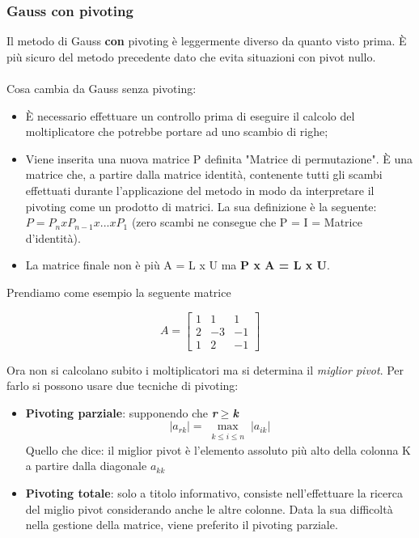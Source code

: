 \subsubsection{Gauss con pivoting}
\label{Gauss con pivoting}
Il metodo di Gauss \textbf{con} pivoting è leggermente diverso da quanto visto prima. È più sicuro del metodo precedente dato che evita situazioni con pivot nullo.\\\\
Cosa cambia da Gauss senza pivoting:
\begin{itemize}
\item È necessario effettuare un controllo prima di eseguire il calcolo del moltiplicatore che potrebbe portare ad uno scambio di righe;
\item Viene inserita una nuova matrice P definita "Matrice di permutazione". È una matrice che, a partire dalla matrice identità, contenente tutti gli scambi effettuati durante l'applicazione del metodo in modo da interpretare il pivoting come un prodotto di matrici. La sua definizione è la seguente: $P = P_n x P_{n-1} x ... x P_1$  (zero scambi ne consegue che P = I = Matrice d'identità).
\item La matrice finale non è più A = L x U ma \textbf{P x A = L x U}.
\end{itemize}

\noindent

Prendiamo come esempio la seguente matrice

$$ A =
\begin{bmatrix}
1 & 1 & 1 \\
2 & -3 & -1 \\
1 & 2 & -1 
\end{bmatrix}
$$

\noindent
Ora non si calcolano subito i moltiplicatori ma si determina il \textit{miglior pivot}. Per farlo si possono usare due tecniche di pivoting:
\begin{itemize}
\item \textbf{Pivoting parziale}: supponendo che \textbf{\textit{r$\geq$k }}
$$ |a_{rk}| = \max_{\substack{k\leq i\leq n}} |a_{ik}|$$
Quello che dice: il miglior pivot è l'elemento assoluto più alto della colonna K a partire dalla diagonale $a_{kk}$
\item \textbf{Pivoting totale}: solo a titolo informativo, consiste nell'effettuare la ricerca del miglio pivot considerando anche le altre colonne. Data la sua difficoltà nella gestione della matrice, viene preferito il pivoting parziale.
\end{itemize}

